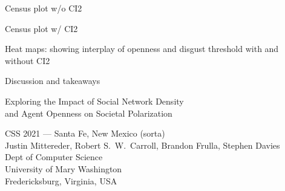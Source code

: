 \documentclass[12pt]{beamer}
\begin{document}
\begin{frame}[c]{Census plot w/o CI2} %

\end{frame}

\begin{frame}[c]{Census plot w/ CI2} %

\end{frame}

\begin{frame}[c]{Heat maps: showing interplay of openness and disgust threshold
with and without CI2} %

\end{frame}


%
%
%
%

\begin{frame}[c]{Discussion and takeaways}  %

\end{frame}

\begin{frame}[c]{}

\begin{center}
\Large
Exploring the Impact of Social Network Density\\and Agent Openness on Societal Polarization

\footnotesize
\vspace{.3in}
CSS 2021 --- Santa Fe, New Mexico (sorta)\\
\vspace{.1in}
Justin Mittereder, Robert S.~W.~Carroll, Brandon Frulla, Stephen Davies\\
\smallskip
\scriptsize
Dept of Computer Science\\
University of Mary Washington\\
Fredericksburg, Virginia, USA\\
\end{center}

\end{frame}
\end{document}
